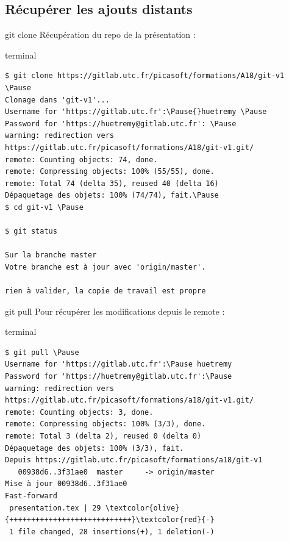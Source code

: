 \documentclass[usepdftitle=false]{beamer}
\newcommand{\Pause}{%
\ifdef{\Release}
  {\pause}
  {}
}
\begin{document}
\subsection{Récupérer les ajouts distants}

\begin{frame}[fragile]{git clone}
	Récupération du repo de la présentation :
	\begin{beamercolorbox}[rounded=true,shadow=true]{terminal}
		\begin{Verbatim}
$ git clone https://gitlab.utc.fr/picasoft/formations/A18/git-v1 \Pause
Clonage dans 'git-v1'...
Username for 'https://gitlab.utc.fr':\Pause{}huetremy \Pause
Password for 'https://huetremy@gitlab.utc.fr': \Pause
warning: redirection vers https://gitlab.utc.fr/picasoft/formations/A18/git-v1.git/
remote: Counting objects: 74, done.
remote: Compressing objects: 100% (55/55), done.
remote: Total 74 (delta 35), reused 40 (delta 16)
Dépaquetage des objets: 100% (74/74), fait.\Pause
$ cd git-v1 \Pause

$ git status

Sur la branche master
Votre branche est à jour avec 'origin/master'.

rien à valider, la copie de travail est propre
		\end{Verbatim}
	\end{beamercolorbox}
\end{frame}

\begin{frame}[fragile]{git pull}
	Pour récupérer les modifications depuis le remote :
	\begin{beamercolorbox}[rounded=true,shadow=true]{terminal}
	\begin{Verbatim}
$ git pull \Pause
Username for 'https://gitlab.utc.fr':\Pause huetremy
Password for 'https://huetremy@gitlab.utc.fr':\Pause 
warning: redirection vers https://gitlab.utc.fr/picasoft/formations/a18/git-v1.git/
remote: Counting objects: 3, done.
remote: Compressing objects: 100% (3/3), done.
remote: Total 3 (delta 2), reused 0 (delta 0)
Dépaquetage des objets: 100% (3/3), fait.
Depuis https://gitlab.utc.fr/picasoft/formations/a18/git-v1
   00938d6..3f31ae0  master     -> origin/master
Mise à jour 00938d6..3f31ae0
Fast-forward
 presentation.tex | 29 \textcolor{olive}{++++++++++++++++++++++++++++}\textcolor{red}{-}
 1 file changed, 28 insertions(+), 1 deletion(-)
	\end{Verbatim}
	\end{beamercolorbox}
\end{frame}
\end{document}
